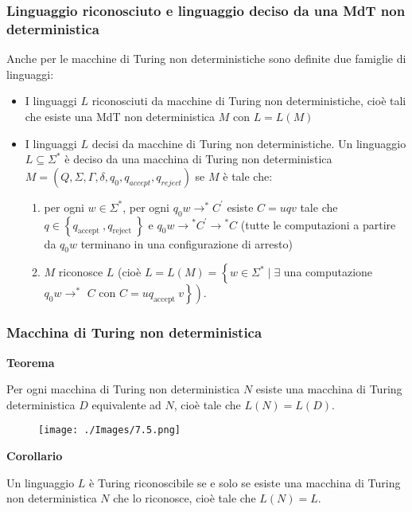 \subsubsection{Linguaggio riconosciuto e linguaggio deciso da una MdT
non deterministica}

Anche per le macchine di Turing non deterministiche sono definite due famiglie di linguaggi:
\begin{itemize}
    \item I linguaggi $L$ riconosciuti da macchine di Turing non deterministiche, cioè tali che esiste una MdT non deterministica $M$ con $L=L(M)$
    \item I linguaggi $L$ decisi da macchine di Turing non deterministiche. Un linguaggio $L \subseteq \Sigma^{*}$ è deciso da una macchina di Turing non deterministica $M=\left(Q, \Sigma, \Gamma, \delta, q_{0}, q_{a c c e p t}, q_{r e j e c t}\right)$ se $M$ è tale che:
    \begin{enumerate}
        \item per ogni $w \in \Sigma^{*}$, per ogni $q_{0} w \rightarrow^{*} C^{\prime}$ esiste $C=u q v$ tale che $q \in\left\{q_{\text {accept }}, q_{\text {reject }}\right\}$ e $q_{0} w \rightarrow{ }^{*} C^{\prime} \rightarrow{ }^{*} C$ (tutte le computazioni a partire da $q_{0} w$ terminano in una configurazione di arresto)
        \item $M$ riconosce $L$ (cioè $L=L(M)=\left\{w \in \Sigma^{*} \mid \exists\right.$ una computazione $q_{0} w \rightarrow^{*}$ $C$ con $\left.\left.C=u q_{\text {accept }} v\right\}\right)$.
    \end{enumerate}
\end{itemize}

\subsubsection{Macchina di Turing non deterministica}

\textbf{Teorema}

Per ogni macchina di Turing non deterministica $N$ esiste una macchina di Turing deterministica $D$ equivalente ad $N$, cioè tale che $L(N)=L(D)$.

\begin{figure}[hbpt!]
    \centering
    \texttt{[image: ./Images/7.5.png]}
\end{figure}
\FloatBarrier

\textbf{Corollario}

Un linguaggio $L$ è Turing riconoscibile se e solo se esiste una macchina di Turing non deterministica $N$ che lo riconosce, cioè tale che $L(N)=L$.

